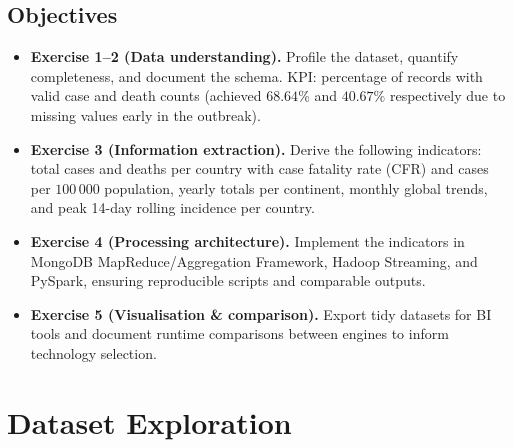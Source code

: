 \documentclass[12pt, a4paper]{article}
\begin{document}
\subsection{Objectives}
\begin{itemize}[leftmargin=1.2cm]
    \item \textbf{Exercise 1--2 (Data understanding).} Profile the dataset, quantify completeness, and document the schema. KPI: percentage of records with valid case and death counts (achieved $68.64\%$ and $40.67\%$ respectively due to missing values early in the outbreak).
    \item \textbf{Exercise 3 (Information extraction).} Derive the following indicators: total cases and deaths per country with case fatality rate (CFR) and cases per $100\,000$ population, yearly totals per continent, monthly global trends, and peak 14-day rolling incidence per country.
    \item \textbf{Exercise 4 (Processing architecture).} Implement the indicators in MongoDB MapReduce/Aggregation Framework, Hadoop Streaming, and PySpark, ensuring reproducible scripts and comparable outputs.
    \item \textbf{Exercise 5 (Visualisation \& comparison).} Export tidy datasets for BI tools and document runtime comparisons between engines to inform technology selection.
\end{itemize}

\section{Dataset Exploration}
\end{document}
